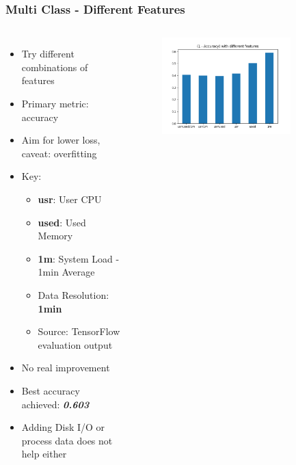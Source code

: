 \documentclass[aspectratio=169,11pt,hyperref={colorlinks=true}]{beamer}
\begin{document}
\begin{frame}
    \frametitle{Multi Class - Different Features}
    \begin{columns}
        \begin{itemize}
            \item{Try different combinations of features}
            \item{Primary metric: accuracy}
            \item{Aim for lower loss, caveat: overfitting}
            \item{Key:}
            \begin{itemize}
              \item{\textbf{usr}: User CPU}
              \item{\textbf{used}: Used Memory}
              \item{\textbf{1m}: System Load - 1min Average}
              \item{Data Resolution: \textbf{1min}}
              \item{Source: TensorFlow evaluation output}
            \end{itemize}
            \item{No real improvement}
            \item{Best accuracy achieved: \emph{\textbf{0.603}}}
            \item{Adding Disk I/O or process data does not help either}
        \end{itemize}
        \begin{center}
        \begin{figure}
          \includegraphics[width=0.8\textwidth,height=0.4\textheight]{graphs/accuracy_by_feature-node_provider_all.png}
        \end{figure}

\end{center}
\end{columns}
\end{frame}
\end{document}
